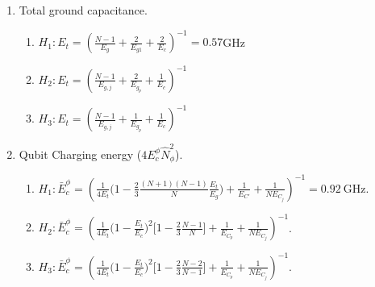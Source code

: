 \documentclass[%
reprint,
superscriptaddress,
 amsmath,amssymb,
 aps,
 prx,
longbibliography,
floatfix,
]{revtex4-2}
\begin{document}
\begin{enumerate}
    \item Total ground capacitance.
    \begin{enumerate}
        \item $H_1: E_t=(\frac{N-1}{E_g}+\frac{2}{E_{g1}}+\frac{2}{E_c})^{-1}=0.57 $GHz
    \item $H_2: E_t=(\frac{N-1}{E_{g,j}}+\frac{2}{E_{g_p}}+\frac{1}{E_c})^{-1}$
    \item $H_3: E_t=(\frac{N-1}{E_{g,j}}+\frac{1}{E_{g_p}}+\frac{1}{E_c})^{-1}$
    \end{enumerate}
\item Qubit Charging energy ($4E_c^\phi \hat N_{\phi}^2$). 
    \begin{enumerate}
    \item $H_1:\bar{E}_c^\phi=(\frac{1}{4E_t}\Big(1-\frac{2}{3}\frac{(N+1)(N-1)}{N}\frac{E_t}{E_g}\Big)+\frac{1}{E_{C'}}+\frac{1}{NE_{C_j}})^{-1}=0.92 \ \mathrm{GHz}$.
    \item $H_2: \bar{E}_c^\phi=(\frac{1}{4E_t}\Big(1-\frac{E_t}{E_c}\Big)^2\Big[1-\frac{2}{3}\frac{N-1}{N}\Big]+\frac{1}{E_{C_p}}+\frac{1}{NE_{C_j}})^{-1}$. 
    \item  $H_3: \bar{E}_c^\phi=(\frac{1}{4E_t}\Big(1-\frac{E_t}{E_c}\Big)^2\Big[1-\frac{2}{3}\frac{N-2}{N-1}\Big]+\frac{1}{E_{C_p}}+\frac{1}{NE_{C_j}})^{-1}$.
    \end{enumerate}
    

\end{enumerate}
\end{document}
